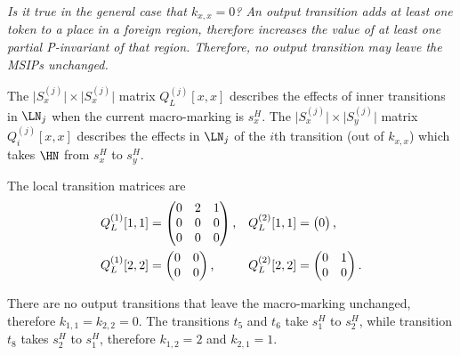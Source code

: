 \emph{Is it true in the general case that $k_{x,x} = 0$? An output
  transition adds at least one token to a place in a \emph{foreign}
  region, therefore increases the value of at least one partial
  P-invariant of that region. Therefore, no output transition may
  leave the MSIPs unchanged.}

The $\lvert S^{(j)}_{x} \rvert \times \lvert S^{(j)}_{x} \rvert$
matrix $Q^{(j)}_L[x, x]$ describes the effects of inner transitions in
$\LN_j$ when the current macro-marking is $s^H_x$. The
$\lvert S^{(j)}_{x} \rvert \times \lvert S^{(j)}_{y} \rvert$ matrix
$Q^{(j)}_i[x, x]$ describes the effects in $\LN_j$ of the $i$th
transition (out of $k_{x, x}$) which takes $\HN$ from $s^H_x$ to
$s^H_y$.

The local transition matrices are
\begin{align}
  Q^{(1)}_L[1, 1] &= \begin{pmatrix}
    0 & 2 & 1 \\
    0 & 0 & 0 \\
    0 & 0 & 0
  \end{pmatrix} \text,
  & Q^{(2)}_L[1, 1] &= \begin{pmatrix}
    0
  \end{pmatrix} \text, \\
  Q^{(1)}_L[2, 2] &= \begin{pmatrix}
    0 & 0 \\
    0 & 0
  \end{pmatrix} \text, &
  Q^{(2)}_L[2, 2] &= \begin{pmatrix}
    0 & 1 \\
    0 & 0
  \end{pmatrix} \text.
\end{align}

There are no output transitions that leave the macro-marking
unchanged, therefore $k_{1, 1} = k_{2, 2} = 0$. The transitions $t_5$
and $t_6$ take $s^H_1$ to $s^H_2$, while transition $t_8$ takes
$s^H_2$ to $s^H_1$, therefore $k_{1, 2} = 2$ and $k_{2, 1} = 1$.

